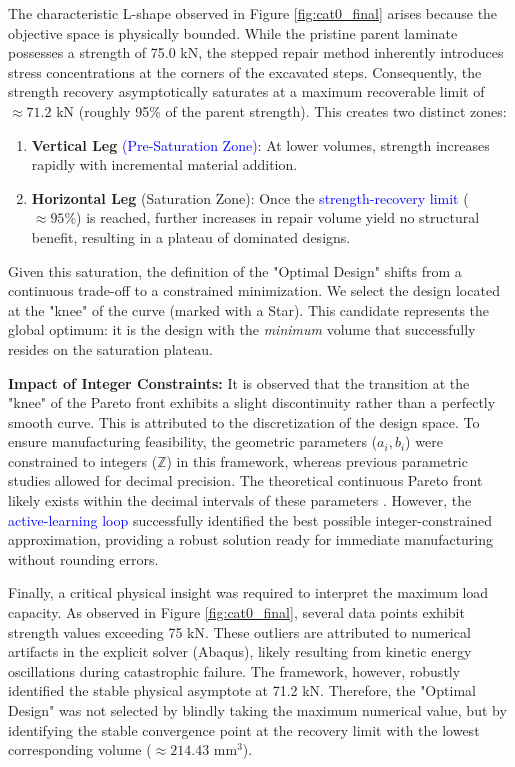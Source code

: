 \documentclass[
  preprint,
  12pt,
  a4paper
]{elsarticle}
\newcommand{\new}[1]{\textcolor{blue}{#1}}
\begin{document}
The characteristic L-shape observed in Figure \ref{fig:cat0_final} arises because the objective space is physically bounded. While the pristine parent laminate possesses a strength of 75.0 kN, the stepped repair method inherently introduces stress concentrations at the corners of the excavated steps. Consequently, the strength recovery asymptotically saturates at a maximum recoverable limit of $\approx 71.2$ kN (roughly 95\% of the parent strength). This creates two distinct zones:
\begin{enumerate}
    \item \textbf{Vertical Leg} \new{(Pre-Saturation Zone)}: At lower volumes, strength increases rapidly with incremental material addition.
    \item \textbf{Horizontal Leg} (Saturation Zone): Once the \new{strength-recovery limit} ($\approx 95\%$) is reached, further increases in repair volume yield no structural benefit, resulting in a plateau of dominated designs.
\end{enumerate}

Given this saturation, the definition of the "Optimal Design" shifts from a continuous trade-off to a constrained minimization. We select the design located at the "knee" of the curve (marked with a Star). This candidate represents the global optimum: it is the design with the \textit{minimum} volume that successfully resides on the saturation plateau.

\textbf{Impact of Integer Constraints:}
It is observed that the transition at the "knee" of the Pareto front exhibits a slight discontinuity rather than a perfectly smooth curve. This is attributed to the discretization of the design space. To ensure manufacturing feasibility, the geometric parameters ($a_i, b_i$) were constrained to integers ($\mathbb{Z}$) in this framework, whereas previous parametric studies \cite{psarras2024design} allowed for decimal precision. The theoretical continuous Pareto front likely exists within the decimal intervals of these parameters . However, the \new{active-learning loop} successfully identified the best possible integer-constrained approximation, providing a robust solution ready for immediate manufacturing without rounding errors.

Finally, a critical physical insight was required to interpret the maximum load capacity. As observed in Figure \ref{fig:cat0_final}, several data points exhibit strength values exceeding 75 kN. These outliers are attributed to numerical artifacts in the explicit solver (Abaqus), likely resulting from kinetic energy oscillations during catastrophic failure. The framework, however, robustly identified the stable physical asymptote at 71.2 kN. Therefore, the "Optimal Design" was not selected by blindly taking the maximum numerical value, but by identifying the stable convergence point at the recovery limit with the lowest corresponding volume ($\approx 214.43$ mm$^3$).
\end{document}
